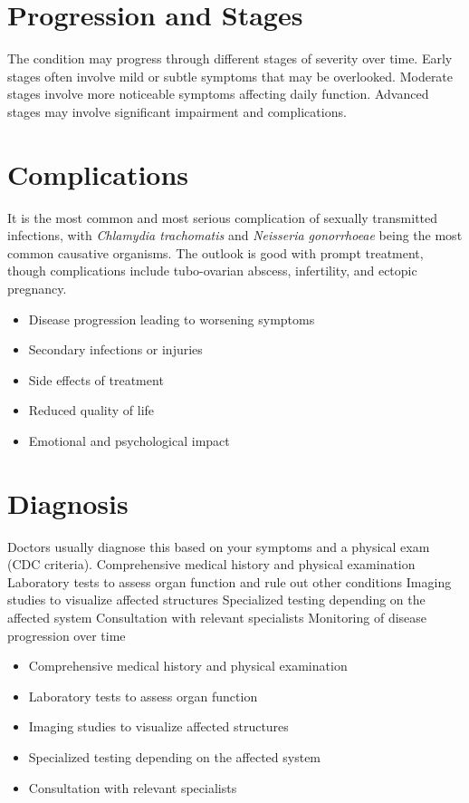 \section{Progression and Stages}
The condition may progress through different stages of severity over time. Early stages often involve mild or subtle symptoms that may be overlooked. Moderate stages involve more noticeable symptoms affecting daily function. Advanced stages may involve significant impairment and complications.
\section{Complications}
It is the most common and most serious complication of sexually transmitted infections, with \textit{Chlamydia trachomatis} and \textit{Neisseria gonorrhoeae} being the most common causative organisms. The outlook is good with prompt treatment, though complications include tubo-ovarian abscess, infertility, and ectopic pregnancy.

\begin{itemize}[noitemsep]
  \item Disease progression leading to worsening symptoms
  \item Secondary infections or injuries
  \item Side effects of treatment
  \item Reduced quality of life
  \item Emotional and psychological impact
\end{itemize}
\section{Diagnosis}
Doctors usually diagnose this based on your symptoms and a physical exam (CDC criteria). Comprehensive medical history and physical examination Laboratory tests to assess organ function and rule out other conditions Imaging studies to visualize affected structures Specialized testing depending on the affected system Consultation with relevant specialists Monitoring of disease progression over time

\begin{itemize}[noitemsep]
  \item Comprehensive medical history and physical examination
  \item Laboratory tests to assess organ function
  \item Imaging studies to visualize affected structures
  \item Specialized testing depending on the affected system
  \item Consultation with relevant specialists
\end{itemize}
